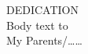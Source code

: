 \begin{center}
    \vspace*{3cm}
    \Large{DEDICATION}\\
    \vspace{1.5\baselineskip}
    Body text
    \vspace*{0.3cm}
    \normalsize{to}\\
    \vspace{3ex}
    \normalsize{My Parents/……}
\end{center}